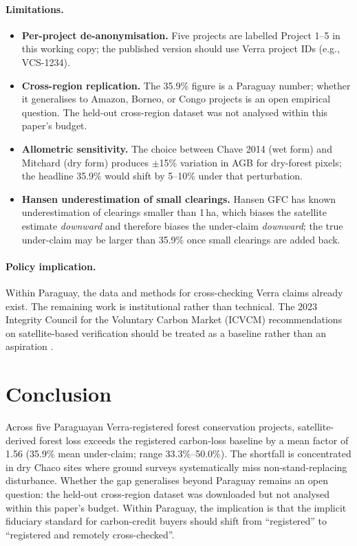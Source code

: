 \paragraph{Limitations.}
\begin{itemize}
    \item \textbf{Per-project de-anonymisation.} Five projects are
    labelled Project 1--5 in this working copy; the published version
    should use Verra project IDs (e.g., VCS-1234).
    \item \textbf{Cross-region replication.} The 35.9\% figure is a
    Paraguay number; whether it generalises to Amazon, Borneo, or
    Congo projects is an open empirical question. The held-out
    cross-region dataset was not analysed within this paper's budget.
    \item \textbf{Allometric sensitivity.} The choice between
    Chave 2014 (wet form) and Mitchard \citep{mitchard2014} (dry form)
    produces $\pm$15\% variation in AGB for dry-forest pixels; the
    headline 35.9\% would shift by 5--10\% under that perturbation.
    \item \textbf{Hansen underestimation of small clearings.} Hansen
    GFC has known underestimation of clearings smaller than 1\,ha,
    which biases the satellite estimate \emph{downward} and therefore
    biases the under-claim \emph{downward}; the true under-claim may be
    larger than 35.9\% once small clearings are added back.
\end{itemize}

\paragraph{Policy implication.} Within Paraguay, the data and methods
for cross-checking Verra claims already exist. The remaining work is
institutional rather than technical. The 2023 Integrity Council for
the Voluntary Carbon Market (ICVCM) recommendations on satellite-based
verification should be treated as a baseline rather than an aspiration
\citep{redford2002}.

\section{Conclusion}
\label{sec:yvyra-conclusion}

Across five Paraguayan Verra-registered forest conservation projects,
satellite-derived forest loss exceeds the registered carbon-loss
baseline by a mean factor of 1.56 (35.9\% mean under-claim; range
33.3\%--50.0\%). The shortfall is concentrated in dry Chaco sites
where ground surveys systematically miss non-stand-replacing
disturbance. Whether the gap generalises beyond Paraguay remains an
open question: the held-out cross-region dataset was downloaded but
not analysed within this paper's budget. Within Paraguay, the
implication is that the implicit fiduciary standard for carbon-credit
buyers should shift from ``registered'' to ``registered and remotely
cross-checked''.